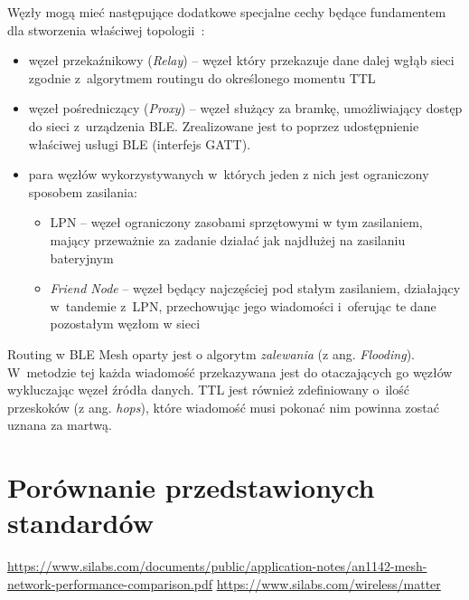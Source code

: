 Węzły mogą mieć następujące dodatkowe specjalne cechy będące fundamentem dla stworzenia właściwej topologii~\cite{woolley_bluetooth_2020, st_an5292_2021}:
\begin{itemize}
\item węzeł przekaźnikowy (\textit{Relay}) -- węzeł który przekazuje dane dalej wgłąb sieci zgodnie z~algorytmem routingu do określonego momentu \gls{TTL}
\item węzeł pośredniczący (\textit{Proxy}) -- węzeł służący za bramkę, umożliwiający dostęp do sieci z~urządzenia BLE. Zrealizowane jest to poprzez
udostępnienie właściwej usługi BLE (interfejs GATT).
\item para węzłów wykorzystywanych w~których jeden z nich jest ograniczony sposobem zasilania:
	\begin{itemize}
	\item \gls{LPN} -- węzeł ograniczony zasobami sprzętowymi w tym zasilaniem, mający przeważnie za zadanie działać jak najdłużej na zasilaniu bateryjnym
	\item \textit{Friend Node} -- węzeł będący najczęściej pod stałym zasilaniem, działający w~tandemie z~\gls{LPN}, przechowując jego wiadomości
	i~oferując te dane pozostałym węzłom w sieci
	\end{itemize}
\end{itemize}

Routing w BLE Mesh oparty jest o algorytm \textit{zalewania} (z ang. \textit{Flooding}). W~metodzie tej każda wiadomość przekazywana
jest do otaczających go węzłów wykluczając węzeł źródła danych. \gls{TTL} jest również zdefiniowany o~ilość przeskoków (z ang. \textit{hops}),
które wiadomość musi pokonać nim powinna zostać uznana za martwą.


\section{Porównanie przedstawionych standardów} %
\url{https://www.silabs.com/documents/public/application-notes/an1142-mesh-network-performance-comparison.pdf}
\url{https://www.silabs.com/wireless/matter}
\lipsum[1-10]


